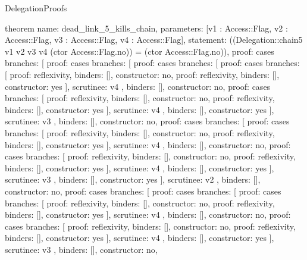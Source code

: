 \begin{lexlean}{DelegationProofs}
\begin{semanticmodule}
theorem{
  name: dead_link_5_kills_chain,
  parameters: [v1 : Access::Flag, v2 : Access::Flag, v3 : Access::Flag, v4 : Access::Flag],
  statement: ((Delegation::chain5 v1 v2 v3 v4 (ctor Access::Flag.no)) = (ctor Access::Flag.no)),
  proof: cases{
    branches: [
      {proof: cases{
        branches: [
          {proof: cases{
            branches: [
              {proof: cases{
                branches: [
                  {proof: reflexivity{}, binders: [], constructor: no},
                  {proof: reflexivity{}, binders: [], constructor: yes}
                ],
                scrutinee: v4
              }, binders: [], constructor: no},
              {proof: cases{
                branches: [
                  {proof: reflexivity{}, binders: [], constructor: no},
                  {proof: reflexivity{}, binders: [], constructor: yes}
                ],
                scrutinee: v4
              }, binders: [], constructor: yes}
            ],
            scrutinee: v3
          }, binders: [], constructor: no},
          {proof: cases{
            branches: [
              {proof: cases{
                branches: [
                  {proof: reflexivity{}, binders: [], constructor: no},
                  {proof: reflexivity{}, binders: [], constructor: yes}
                ],
                scrutinee: v4
              }, binders: [], constructor: no},
              {proof: cases{
                branches: [
                  {proof: reflexivity{}, binders: [], constructor: no},
                  {proof: reflexivity{}, binders: [], constructor: yes}
                ],
                scrutinee: v4
              }, binders: [], constructor: yes}
            ],
            scrutinee: v3
          }, binders: [], constructor: yes}
        ],
        scrutinee: v2
      }, binders: [], constructor: no},
      {proof: cases{
        branches: [
          {proof: cases{
            branches: [
              {proof: cases{
                branches: [
                  {proof: reflexivity{}, binders: [], constructor: no},
                  {proof: reflexivity{}, binders: [], constructor: yes}
                ],
                scrutinee: v4
              }, binders: [], constructor: no},
              {proof: cases{
                branches: [
                  {proof: reflexivity{}, binders: [], constructor: no},
                  {proof: reflexivity{}, binders: [], constructor: yes}
                ],
                scrutinee: v4
              }, binders: [], constructor: yes}
            ],
            scrutinee: v3
          }, binders: [], constructor: no},
}}}}
\end{semanticmodule}
\end{lexlean}
